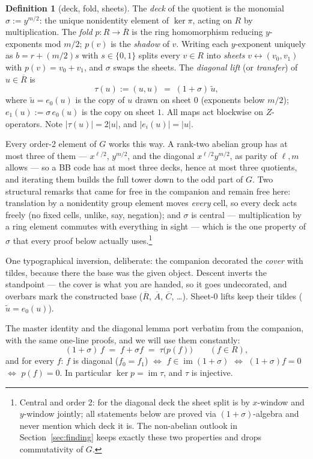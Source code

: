 \documentclass[11pt]{article}
\theoremstyle{plain}
\theoremstyle{definition}
\newtheorem{definition}[theorem]{Definition}
\theoremstyle{remark}
\newcommand{\Rbase}{\overline{R}}
\newcommand{\Rcov}{R}
\newcommand{\wt}[1]{\lvert #1\rvert}
\newcommand{\ov}[1]{\overline{#1}}
\begin{document}
\begin{definition}[deck, fold, sheets]\label{def:deck}
The \emph{deck} of the quotient is the monomial $\sigma := y^{m/2}$: the
unique nonidentity element of $\ker \pi$, acting on $\Rcov$ by
multiplication. The \emph{fold} $p : \Rcov \to \Rbase$ is the ring
homomorphism reducing $y$-exponents mod $m/2$; $p(v)$ is the
\emph{shadow} of $v$. Writing each $y$-exponent uniquely as $b = r + (m/2)s$
with $s \in \{0,1\}$ splits every $v \in \Rcov$ into \emph{sheets}
$v \leftrightarrow (v_0, v_1)$ with $p(v) = v_0 + v_1$, and $\sigma$
swaps the sheets. The \emph{diagonal lift} (or \emph{transfer}) of
$u \in \Rbase$ is
\[
\tau(u) := (u, u) \;=\; (1 + \sigma)\,\widetilde u ,
\]
where $\widetilde u = e_0(u)$ is the copy of $u$ drawn on sheet $0$
(exponents below $m/2$); $e_1(u) := \sigma\, e_0(u)$ is the copy on sheet
$1$. All maps act blockwise on $Z$-operators. Note $\wt{\tau(u)} =
2\wt{u}$, and $\wt{e_i(u)} = \wt{u}$.
\end{definition}

Every order-2 element of $G$ works this way. A rank-two abelian group has
at most three of them --- $x^{\ell/2}$, $y^{m/2}$, and the diagonal
$x^{\ell/2}y^{m/2}$, as parity of $\ell, m$ allows --- so a BB code has at
most three decks, hence at most three quotients, and iterating them builds
the full tower down to the odd part of $G$. Two structural remarks that
came for free in the companion and remain free here: translation by a
nonidentity group element moves \emph{every} cell, so every deck acts
freely (no fixed cells, unlike, say, negation); and $\sigma$ is central
--- multiplication by a ring element commutes with everything in sight ---
which is the one property of $\sigma$ that every proof below actually
uses.\footnote{Central and order 2: for the diagonal deck the sheet split
is by $x$-window and $y$-window jointly; all statements below are proved
via $(1+\sigma)$-algebra and never mention which deck it is. The
non-abelian outlook in Section~\ref{sec:finding} keeps exactly these two
properties and drops commutativity of $G$.}

One typographical inversion, deliberate: the companion decorated the
\emph{cover} with tildes, because there the base was the given object.
Descent inverts the standpoint --- the cover is what you are handed, so it
goes undecorated, and overbars mark the constructed base
($\Rbase$, $\ov A$, $\ov C$, \dots). Sheet-$0$ lifts keep their tildes
($\widetilde u = e_0(u)$).

The master identity and the diagonal lemma port verbatim from the
companion, with the same one-line proofs, and we will use them constantly:
\begin{equation}\label{eq:master}
(1 + \sigma)\, f \;=\; f + \sigma f \;=\; \tau\bigl(p(f)\bigr)
\qquad (f \in \Rcov),
\end{equation}
and for every $f$: $f$ is diagonal ($f_0 = f_1$) $\iff$ $f \in
\operatorname{im}(1+\sigma)$ $\iff$ $(1+\sigma)f = 0$ $\iff$ $p(f) = 0$.
In particular $\ker p = \operatorname{im} \tau$, and $\tau$ is injective.
\end{document}
